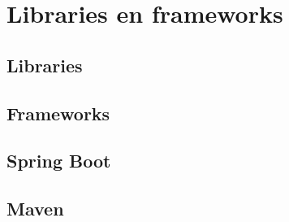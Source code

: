 \chapter{Libraries en frameworks}

\section{Libraries}

\section{Frameworks}

\section{Spring Boot}

\section{Maven}